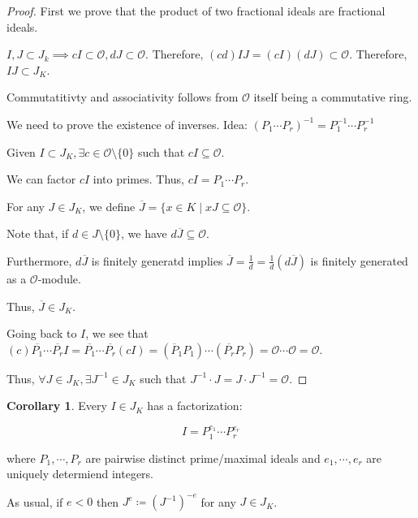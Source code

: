 \documentclass[openany]{amsbook}
\numberwithin{section}{chapter}
\theoremstyle{definition}
\newtheorem{corollary}[theorem]{Corollary}
\begin{document}
\begin{proof}
    First we prove that the product of two fractional ideals are fractional ideals.

    \(I, J \subset J_k \implies cI \subset \mathcal{O}, dJ \subset \mathcal{O}\). Therefore, \((cd)IJ = (cI)(dJ) \subset \mathcal{O}\). Therefore, \(IJ \subset J_K\).

    Commutatitivty and associativity follows from \(\mathcal{O}\) itself being a commutative ring.

    We need to prove the existence of inverses. Idea: \((P_1 \cdots P_r) ^{-1} = P_1 ^{-1} \cdots P_r ^{-1}\) 

    Given \(I \subset J_K, \exists c \in \mathcal{O} \setminus \{ 0 \} \) such that \(cI \subseteq \mathcal{O} \).

    We can factor \(cI\) into primes. Thus, \(cI = P_1 \cdots P_r\).

    For any \(J \in J_K\), we define \(\overline{J} = \{ x \in K \mid xJ \subseteq \mathcal{O} \} \).

    Note that, if \(d\in J \setminus \{ 0 \}\), we have \(d \overline{J} \subseteq \mathcal{O}\).

    Furthermore, \(d \overline{J} \) is finitely generatd implies \(\overline{J} = \frac{1}{d} = \frac{1}{d}(d \overline{J})\) is finitely generated as a \(\mathcal{O}\)-module. 
    
    Thus, \(\overline{J} \in J_K\).

    Going back to \(I\), we see that \((c) \overline{P_1} \cdots \overline{P_r} I = \overline{P_1} \cdots \overline{P_r} (cI) = (\overline{P}_1 P_1) \cdots (\overline{P_r} P_r) = \mathcal{O} \cdots \mathcal{O} = \mathcal{O}\).  

    Thus, \(\forall J \in J_K, \exists J ^{-1} \in J_K\) such that \(J ^{-1} \cdot J = J \cdot J ^{-1} = \mathcal{O}\).

\end{proof}

\begin{corollary}
    Every \(I \in J_K\) has a factorization:

    \[
        I = P_1 ^ {e_1} \cdots P_r^{e_r}
    \]

    where \(P_1, \cdots , P_r\) are pairwise distinct prime/maximal ideals and \(e_1, \cdots , e_r\) are uniquely determiend integers.

    As usual, if \(e < 0\) then \(J^e \coloneqq (J ^{-1} )^{-e}\) for any \(J \in J_K\).

\end{corollary}
\end{document}
